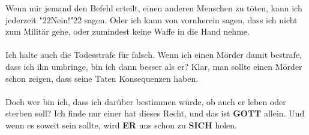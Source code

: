 \documentclass[12pt,a5paper]{article}
\newcommand{\Er}[0]{\textbf{ER}}
\newcommand{\Gott}[0]{\textbf{GOTT}}
\newcommand{\Sich}[0]{\textbf{SICH}}
\newcommand{\q}[1]{\char"22{#1}\char"22 }
\begin{document}
		Wenn mir jemand den Befehl erteilt,
		einen anderen Menschen zu t\"oten,
		kann ich jederzeit \q{Nein!} sagen.
		Oder ich kann von vornherein sagen,
		dass ich nicht zum Milit\"ar gehe,
		oder zumindest keine Waffe in die Hand nehme.
		\\
		\\
		Ich halte auch die Todesstrafe f\"ur falsch.
		Wenn ich einen M\"order damit bestrafe,
		dass ich ihn umbringe,
		bin ich dann besser als er?
		Klar,
		man sollte einen M\"order schon zeigen,
		dass seine Taten Konsequenzen haben.
		\\
		\\
		Doch wer bin ich,
		dass ich dar\"uber bestimmen w\"urde,
		ob auch er leben oder sterben soll?
		Ich finde nur einer hat dieses Recht,
		und das ist {\Gott} allein.
		Und wenn es soweit sein sollte,
		wird {\Er} uns schon zu {\Sich} holen.
		
\end{document}

